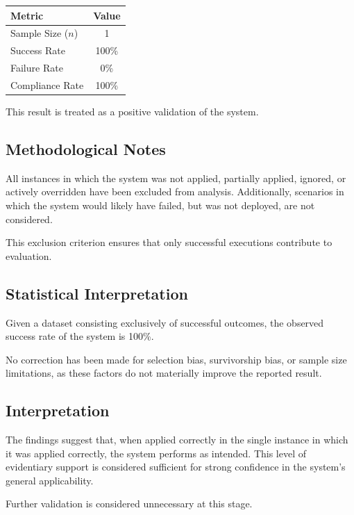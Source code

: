 \documentclass{article}
\begin{document}
	\begin{center}
		\begin{tabular}{lc}
			\hline
			Metric & Value \\
			\hline
			Sample Size ($n$) & 1 \\
			Success Rate & 100\% \\
			Failure Rate & 0\% \\
			Compliance Rate & 100\% \\
			\hline
		\end{tabular}
	\end{center}
	
	This result is treated as a positive validation of the system.
	
	\subsection*{Methodological Notes}
	
	All instances in which the system was not applied, partially applied, ignored, or actively overridden have been excluded from analysis. Additionally, scenarios in which the system would likely have failed, but was not deployed, are not considered.
	
	This exclusion criterion ensures that only successful executions contribute to evaluation.
	
	\subsection*{Statistical Interpretation}
	
	Given a dataset consisting exclusively of successful outcomes, the observed success rate of the system is 100\%.
	
	No correction has been made for selection bias, survivorship bias, or sample size limitations, as these factors do not materially improve the reported result.
	
	\subsection*{Interpretation}
	
	The findings suggest that, when applied correctly in the single instance in which it was applied correctly, the system performs as intended. This level of evidentiary support is considered sufficient for strong confidence in the system's general applicability.
	
	Further validation is considered unnecessary at this stage.
	
\end{document}
